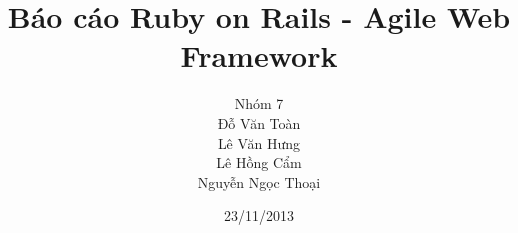 ﻿

\title{Báo cáo Ruby on Rails - Agile Web Framework}

\author{Nhóm 7\\ Đỗ Văn Toàn\\ Lê Văn Hưng\\ Lê Hồng Cẩm\\ Nguyễn Ngọc Thoại}
\date{23/11/2013}
\maketitle
\tableofcontents










